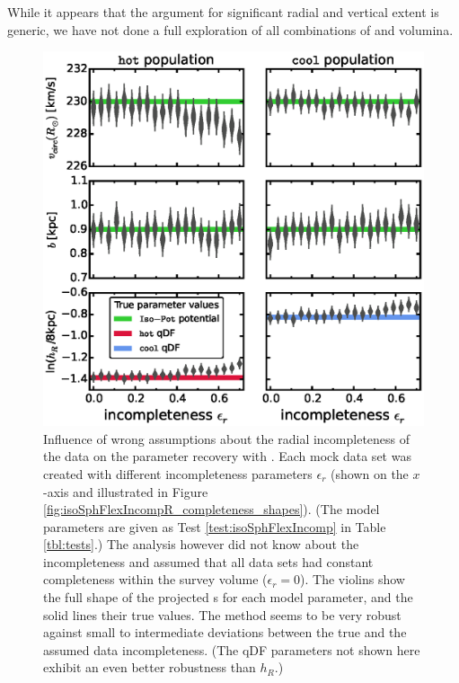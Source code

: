 While it appears that the argument for significant radial and vertical extent is generic, we have not done a full exploration of all combinations of \pmodel{} and volumina.




\begin{figure}[!htbp]
\centering
\includegraphics[width=\columnwidth]{figs/isoSphFlexIncompR_violins_2.eps}
\caption{Influence of wrong assumptions about the radial incompleteness of the data on the parameter recovery with \RM{}. Each mock data set was created with different incompleteness parameters $\epsilon_r$ (shown on the $x$-axis and illustrated in Figure \ref{fig:isoSphFlexIncompR_completeness_shapes}). (The model parameters are given as Test \ref{test:isoSphFlexIncomp} in Table \ref{tbl:tests}.) The analysis however did not know about the incompleteness and assumed that all data sets had constant completeness within the survey volume ($\epsilon_r = 0$). The violins show the full shape of the projected \pdf{}s for each model parameter, and the solid lines their true values. The \RM{} method seems to be very robust against small to intermediate deviations between the true and the assumed data incompleteness. (The qDF parameters not shown here exhibit an even better robustness than $h_R$.) \Wilma{[TO DO: $\text{km s}^{-1}$]}} 
\label{fig:isoSphFlexIncompR_violins}
\end{figure}

